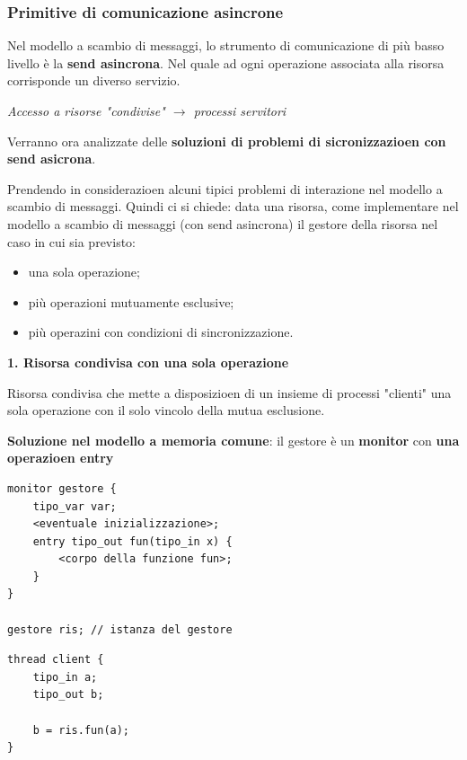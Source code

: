 \documentclass{article}
\begin{document}
\subsubsection{Primitive di comunicazione asincrone}

Nel modello a scambio di messaggi, lo strumento di comunicazione di più basso livello è la \textbf{send asincrona}. Nel quale ad ogni operazione associata alla risorsa corrisponde
un diverso servizio.

\vspace{3mm}
\textit{Accesso a risorse "condivise" $\rightarrow$ processi servitori}

\vspace{3mm}

Verranno ora analizzate delle \textbf{soluzioni di problemi di sicronizzazioen con send asicrona}.

Prendendo in considerazioen alcuni tipici problemi di interazione nel modello a scambio di messaggi. Quindi ci si chiede: data una risorsa, come implementare nel modello a scambio
di messaggi (con send asincrona) il gestore della risorsa nel caso in cui sia previsto:
\begin{itemize}
    \item una sola operazione;
    \item più operazioni mutuamente esclusive;
    \item più operazini con condizioni di sincronizzazione.
\end{itemize}

\vspace{5mm}
{\large \textbf{1. Risorsa condivisa con una sola operazione}}

\vspace{3mm}
Risorsa condivisa che mette a disposizioen di un insieme di processi "clienti" una sola operazione con il solo vincolo della mutua esclusione.

\vspace{3mm}
\textbf{Soluzione nel modello a memoria comune}: il gestore è un \textbf{monitor} con \textbf{una operazioen entry}

\noindent
\begin{minipage}{.45\columnwidth}
\begin{lstlisting}
monitor gestore {
    tipo_var var;
    <eventuale inizializzazione>;
    entry tipo_out fun(tipo_in x) {
        <corpo della funzione fun>;
    }
}

gestore ris; // istanza del gestore
\end{lstlisting}
\end{minipage}\hfill
\begin{minipage}{.45\columnwidth}
\begin{lstlisting}
thread client {
    tipo_in a;
    tipo_out b;

    b = ris.fun(a);
}
\end{lstlisting}
\end{minipage}
\end{document}
